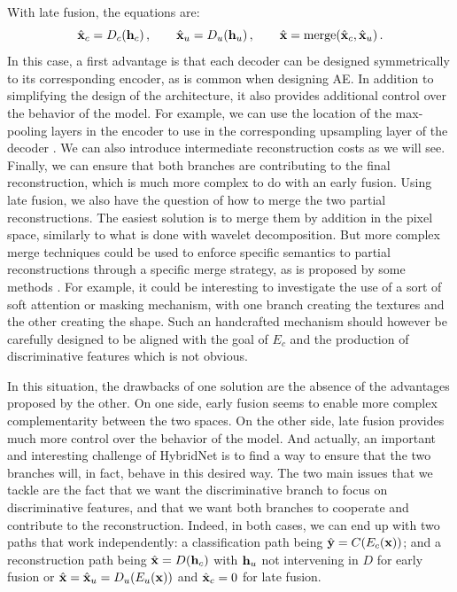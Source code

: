 With late fusion, the equations are:
\begin{equation}
	\hat{\mathbf{x}}_c = D_c(\mathbf{h}_c)\,,\qquad \hat{\mathbf{x}}_u = D_u(\mathbf{h}_u)\,,\qquad \hat{\mathbf{x}} = \mathrm{merge}(\hat{\mathbf{x}}_c, \hat{\mathbf{x}}_u)\,.
\end{equation}
In this case, a first advantage is that each decoder can be designed symmetrically to its corresponding encoder, as is common when designing \ac{AE}. In addition to simplifying the design of the architecture, it also provides additional control over the behavior of the model. For example, we can use the location of the max-pooling layers in the encoder to use in the corresponding upsampling layer of the decoder \citep{Zhao2016a}. We can also introduce intermediate reconstruction costs as we will see. Finally, we can ensure that both branches are contributing to the final reconstruction, which is much more complex to do with an early fusion. Using late fusion, we also have the question of how to merge the two partial reconstructions. The easiest solution is to merge them by addition in the pixel space, similarly to what is done with wavelet decomposition. But more complex merge techniques could be used to enforce specific semantics to partial reconstructions through a specific merge strategy, as is proposed by some methods \citep{shu2017neural,Shu_2018_ECCV,luvizon2017human}. For example, it could be interesting to investigate the use of a sort of soft attention or masking mechanism, with one branch creating the textures and the other creating the shape. Such an handcrafted mechanism should however be carefully designed to be aligned with the goal of $E_c$ and the production of discriminative features which is not obvious.

In this situation, the drawbacks of one solution are the absence of the advantages proposed by the other. On one side, early fusion seems to enable more complex complementarity between the two spaces. On the other side, late fusion provides much more control over the behavior of the model.
%
And actually, an important and interesting challenge of HybridNet is to find a way to ensure that the two branches will, in fact, behave in this desired way. The two main issues that we tackle are the fact that we want the discriminative branch to focus on discriminative features, and that we want both branches to cooperate and contribute to the reconstruction. Indeed, in both cases, we can end up with two paths that work independently: a classification path being $\hat{\mathbf{y}} = C(E_c(\mathbf{x}))$; and a reconstruction path being $\hat{\mathbf{x}} = D(\mathbf{h}_c)$ with $\mathbf{h}_u$ not intervening in $D$ for early fusion or $\hat{\mathbf{x}} = \hat{\mathbf{x}}_u = D_u(E_u(\mathbf{x}))$ and $\hat{\mathbf{x}}_c = 0$ for late fusion.

